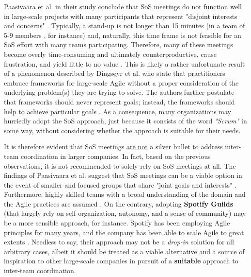 \documentclass[conference]{IEEEtran}
\begin{document}
Paasivaara et al. in their study conclude that SoS meetings do not function
well in large-scale projects with many participants that represent "disjoint
interests and concerns" \cite{Paasivaara2012}. Typically, a stand-up is not
longer than 15 minutes (in a team of 5-9 members \cite{Schwaber2020}, for
instance) and, naturally, this time frame is not feasible for an SoS effort
with many teams participating. Therefore, many of these meetings become overly
time-consuming and ultimately counterproductive, cause frustration, and yield
little to no value \cite{Paasivaara2012}. This is likely a rather unfortunate
result of a phenomenon described by Dings\o{}yr et al. \cite{Dingsoyr2019} who
state that practitioners embrace frameworks for large-scale Agile without a
proper consideration of the underlying problem(s) they are trying to solve. The
authors further postulate that frameworks should never represent goals;
instead, the frameworks should help to achieve particular goals
\cite{Dingsoyr2019}. As a consequence, many organizations may hurriedly adopt
the SoS approach, just because it consists of the word  \textit{"Scrum"} in
some way, without considering whether the approach is suitable for their needs.

It is therefore evident that SoS meetings \underline{are not} a silver bullet
to address inter-team coordination in larger companies. In fact, based on the
previous observations, it is not recommended to solely rely on SoS meetings at
all. The findings of Paasivaara et al. suggest that SoS meetings can be a
viable option in the event of smaller and focused groups that share "joint
goals and interests" \cite{Paasivaara2012}. Furthermore, highly skilled teams
with a broad understanding of the domain and the Agile practices are assumed
\cite{Sutherland2007}. On the contrary, adopting \textbf{Spotify Guilds} (that
largely rely on self-organization, autonomy, and a sense of community)
\cite{Smite2019} may be a more sensible approach, for instance. Spotify has
been employing Agile principles for many years, and the company has been able
to scale Agile to great extents \cite{Alqudah2016}. Needless to say, their
approach may not be a \textit{drop-in} solution for all arbitrary cases, albeit
it should be treated as a viable alternative and a source of inspiration to
other large-scale companies in pursuit of a \textbf{suitable} approach to
inter-team coordination.
\end{document}
